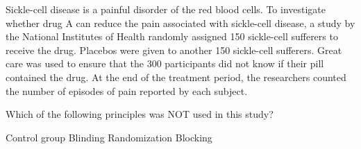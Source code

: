 \documentclass{article}
\begin{document}
\begin{mcquestions}
		\begin{mcquestioninstruction}
			Sickle-cell disease is a painful disorder of the red blood cells. To investigate whether drug A can reduce the pain associated with sickle-cell disease, a study by the National Institutes of Health randomly assigned 150 sickle-cell sufferers to receive the drug. Placebos were given to another 150 sickle-cell sufferers. Great care was used to ensure that the 300 participants did not know if their pill contained the drug. At the end of the treatment period, the researchers counted the number of episodes of pain reported by each subject.
		\end{mcquestioninstruction}
		\question Which of the following principles was NOT used in this study?
		\begin{mcanswerslist}
			\answer Control group
			\answer Blinding
			\answer Randomization
			\answer[correct] Blocking
		\end{mcanswerslist}
		
	\end{mcquestions}
\end{document}
